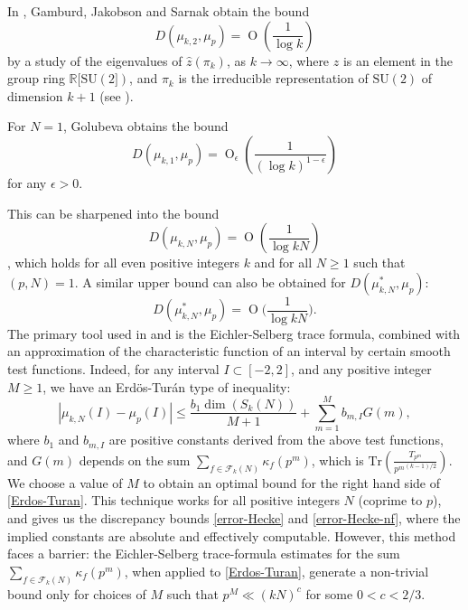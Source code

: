 \documentclass[reqno]{amsart}
\theoremstyle{plain}
\theoremstyle{definition}
\theoremstyle{remark}
\def\R{\mathbb R}
\def\dim{\operatorname{dim}}
\def\R{\mathbb R}
\def\dim{\operatorname{dim}}
\def\O{\operatorname{O}}
\def\log{\operatorname{log}}
\def\SU{\mathrm{SU}}
\begin{document}
In \cite{GJS}, Gamburd, Jakobson and Sarnak obtain the bound 
$$D(\mu_{k,2},\mu_p) = \O\left(\frac{1}{\log k}\right)$$
by a study of the eigenvalues of $\widehat{z}(\pi_k)$, as $k \to \infty$, where $z$ is an element in the group ring $\R[\SU(2])$, and $\pi_k$ is the irreducible representation of $\SU(2)$ of dimension $k+1$ (see \cite[Theorem 1.3]{GJS}). 

For $N=1$, Golubeva \cite{Golubeva} obtains the bound 
$$D(\mu_{k,1},\mu_p) = \O_{\epsilon}\left(\frac{1}{(\log k)^{1 - \epsilon}}\right)$$
for any $\epsilon > 0$.

This can be sharpened into the bound
\begin{equation}\label{error-Hecke}
D(\mu_{k,N},\mu_p)=\O\left(\frac{1}{\log kN} \right)
\end{equation}
\cite{MSeffective}, which holds  for all even positive integers $k$ and for all $N \geq 1$ such that $(p,N) = 1.$
A similar upper bound \cite{MS2} can also be obtained for $D(\mu_{k,N}^*,\mu_p)$:
\begin{equation}\label{error-Hecke-nf}
D(\mu_{k,N}^*,\mu_p)=\O\Big(\frac{1}{\log kN}\Big).
\end{equation}
The primary tool used in \cite{Golubeva} and  \cite{MSeffective} is the Eichler-Selberg trace formula, combined with an approximation of the characteristic function of an interval by certain smooth test functions.  Indeed, for any interval $I \subset [-2,2]$, and any positive integer $M \geq 1$, we have an Erd\"{o}s-Tur\'{a}n type of inequality: 
\begin{equation}\label{Erdos-Turan}
 |\mu_{k,N}(I)-\mu_p(I)| \leq \frac{b_1\dim(S_k(N))}{M+1} + \sum_{m=1}^M {b_{m,I} G(m)},
 \end{equation}
where $b_1$ and $b_{m,I}$ are positive constants derived from the above test functions, and $G(m)$ depends on the sum $\sum_{f \in \mathcal F_k(N)} \kappa_f(p^m)$, which is $\mathrm{Tr}\left(\frac{T_{p^m}}{{p^m}^{(k-1)/2}}\right)$.  We choose a value of $M$ to obtain an optimal bound for the right hand side of \eqref{Erdos-Turan}.  This technique works for all positive integers $N$ (coprime to $p$), and gives us the discrepancy bounds
\eqref{error-Hecke} and \eqref{error-Hecke-nf}, where the implied constants are absolute and effectively computable.  However, this method faces a barrier: the Eichler-Selberg trace-formula estimates for the sum $\sum_{f \in \mathcal F_k(N)} \kappa_f(p^m)$, when applied to \eqref{Erdos-Turan}, generate a non-trivial bound only for choices of $M$ such that $p^M \ll (kN)^c$ for some $0 < c < 2/3 $.
\end{document}
